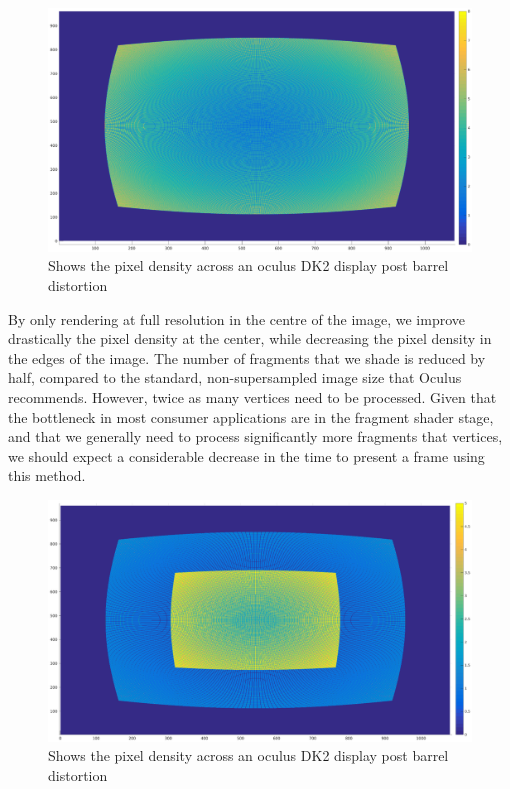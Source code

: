 \documentclass[12pt,a4paper,twoside,openright]{report}
\begin{document}
\begin{figure}[tbh]
\begin{center}
\includegraphics[width=12cm]{figs/oculus_pixel_density.eps}
\caption{Shows the pixel density across an oculus DK2 display post barrel distortion}
\label{epsfig1}
\end{center}
\end{figure}

By only rendering at full resolution in the centre of the image, we improve drastically the pixel density at the center, while decreasing the pixel density in the edges of the image. The number of fragments that we shade is reduced by half, compared to the standard, non-supersampled image size that Oculus recommends. However, twice as many vertices need to be processed. Given that the bottleneck in most consumer applications are in the fragment shader stage, and that we generally need to process significantly more fragments that vertices, we should expect a considerable decrease in the time to present a frame using this method. 

\begin{figure}[tbh]
\begin{center}
\includegraphics[width=12cm]{figs/oculus_pixel_density_optimisation.eps}
\caption{Shows the pixel density across an oculus DK2 display post barrel distortion}
\label{epsfig1}
\end{center}
\end{figure}
\end{document}
